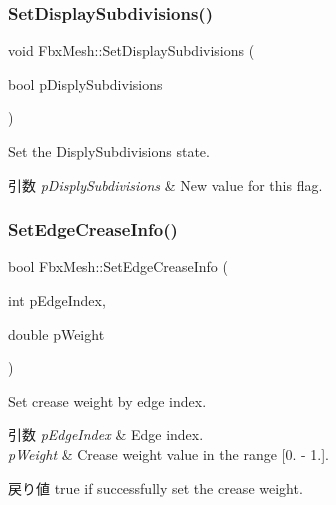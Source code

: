 \subsubsection{\texorpdfstring{Set\+Display\+Subdivisions()}{SetDisplaySubdivisions()}}
{\footnotesize\ttfamily void Fbx\+Mesh\+::\+Set\+Display\+Subdivisions (\begin{DoxyParamCaption}\item[{bool}]{p\+Disply\+Subdivisions }\end{DoxyParamCaption})}

Set the Disply\+Subdivisions state. 
\begin{DoxyParams}{引数}
{\em p\+Disply\+Subdivisions} & New value for this flag. \\
\hline
\end{DoxyParams}
\mbox{\label{class_fbx_mesh_a78f36e935449e10bf16da30f0657d5d5}} 
\subsubsection{\texorpdfstring{Set\+Edge\+Crease\+Info()}{SetEdgeCreaseInfo()}}
{\footnotesize\ttfamily bool Fbx\+Mesh\+::\+Set\+Edge\+Crease\+Info (\begin{DoxyParamCaption}\item[{int}]{p\+Edge\+Index,  }\item[{double}]{p\+Weight }\end{DoxyParamCaption})}

Set crease weight by edge index. 
\begin{DoxyParams}{引数}
{\em p\+Edge\+Index} & Edge index. \\
\hline
{\em p\+Weight} & Crease weight value in the range \mbox{[}0. -\/ 1.\mbox{]}. \\
\hline
\end{DoxyParams}
\begin{DoxyReturn}{戻り値}
{\ttfamily true} if successfully set the crease weight. 
\end{DoxyReturn}
\mbox{\label{class_fbx_mesh_a7b6ac7bf75d56cfce591c516c2635936}} 
